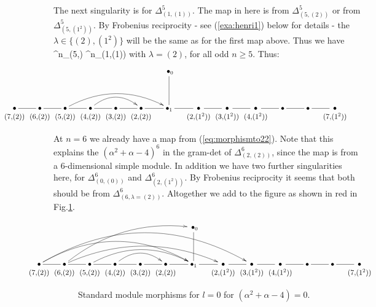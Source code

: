 The next singularity is for $\Delta^{5}_{(1,(1))}$. 
The map in here is from 
$\Delta^{5}_{(5,(2))}$ or from $\Delta^{5}_{(5,(1^2))}$. 
By Frobenius reciprocity 
- see (\ref{exa:henri1}) below for details - 
the $\lambda\in\{ (2),(1^2)\}$ will be the same as for the first map above. 
Thus we have 
\beq \label{eq:morphismto11} 
\Delta^n_{(5,\lambda)}  \rightarrow \Delta^n_{(1,(1))}
\eq 
with $\lambda=(2)$, 
for all odd $n \geq 5$. 
Thus: 
\[
\hspace{-2.1cm} 
\xymatrix{
   &&&&&& \;\bullet_0 \ar@{-}[d] \\
\ver{(7,\!(2))} \ar@{-}[r] & 
\ver{(6,\!(2))} \ar@{-}[r] & 
\ver{(5,\!(2))} \ar@{-}[r]  \ar@[red]@/^1.7pc/[rrrr] & 
\ver{(4,\!(2))} \ar@{-}[r] \ar@[red]@/^1.3pc/[rr] & 
\ver{(3,\!(2))} \ar@{-}[r] & 
\ver{(2,\!(2))} \ar@{-}[r] & 
\bullet_1 \ar@{-}[r] & 
\ver{(2,\!(1^2))} \ar@{-}[r] & 
\ver{(3,\!(1^2))} \ar@{-}[r] & 
\ver{(4,\!(1^2))} \ar@{-}[r] & 
\bullet \ar@{-}[r] & 
\bullet \ar@{-}[r] & 
\ver{(7,\!(1^2))} & 
}
\]

At $n=6$ we already have a map from  (\ref{eq:morphismto22}). 
Note that this explains the $(\alpha^2+\alpha-4)^6$ in the gram-det of 
$ \Delta^6_{(2,(2))}  $, since the map is   %
from a 6-dimensional simple module. 
In addition we have two further singularities here, for 
$ \Delta^6_{(0,(0))}  $    and   $ \Delta^6_{(2,(1^2))}  $. 
By Frobenius reciprocity it seems that both should be from 
$ \Delta^6_{(6,\lambda=(2))}  $. %
Altogether we add to the figure as shown in red in Fig.\ref{fig:standardmapshenri}. 

\begin{figure}
\[
\hspace{-2.1cm} 
\xymatrix{
   &&&&&& \;\bullet_0 \ar@{-}[d] \\
\ver{(7,\!(2))} \ar@{-}[r] \ar@[green]@/^2.643pc/[rrrrrr] \ar@[green]@/^3.643pc/[rrrrrrrr] & 
\ver{(6,\!(2))} \ar@{-}[r] \ar@[red]@/^1.7pc/[rrrrru] \ar@[red]@/^2.1pc/[rrrrrr] & 
\ver{(5,\!(2))} \ar@{-}[r]  \ar@[red]@/^1.7pc/[rrrr] & 
\ver{(4,\!(2))} \ar@{-}[r] \ar@[red]@/^1.3pc/[rr] & 
\ver{(3,\!(2))} \ar@{-}[r] & 
\ver{(2,\!(2))} \ar@{-}[r] & 
\bullet_1 \ar@{-}[r] & 
\ver{(2,\!(1^2))} \ar@{-}[r] & 
\ver{(3,\!(1^2))} \ar@{-}[r] & 
\ver{(4,\!(1^2))} \ar@{-}[r] & 
\bullet \ar@{-}[r] & 
\bullet \ar@{-}[r] & 
\ver{(7,\!(1^2))} & 
}
\]
    \caption{ Standard module morphisms for $l=0$ for $(\alpha^2+\alpha-4)=0$. \label{fig:standardmapshenri} }
\end{figure}


